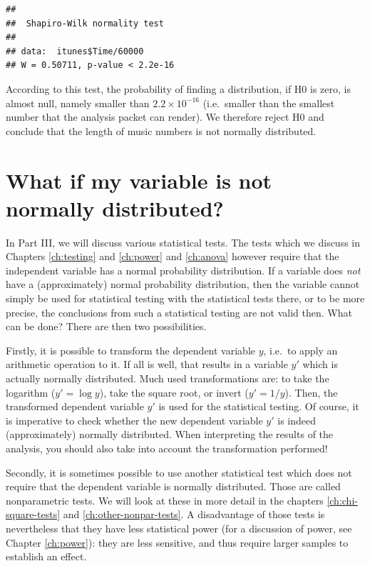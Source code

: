 \documentclass[
]{book}
\begin{document}
\begin{verbatim}
## 
##  Shapiro-Wilk normality test
## 
## data:  itunes$Time/60000
## W = 0.50711, p-value < 2.2e-16
\end{verbatim}

According to this test, the probability of finding a distribution, if H0 is
zero, is almost null, namely smaller than \(2.2 \times 10^{-16}\) (i.e.~smaller than
the smallest number that the analysis packet can render). We therefore
reject H0 and conclude that the length of music numbers is not normally
distributed.

\hypertarget{sec:whatifnotnormal}{%
\section{What if my variable is not normally distributed?}\label{sec:whatifnotnormal}}

In Part III, we will discuss various statistical tests.
The tests which we discuss in Chapters \ref{ch:testing} and \ref{ch:power} and
\ref{ch:anova} however require that the independent
variable has a normal probability distribution. If a variable does \emph{not} have
a (approximately) normal probability distribution, then the variable cannot
simply be used for statistical testing with the statistical tests
there, or to be more precise, the conclusions from such a statistical testing
are not valid then. What can be done? There are then two
possibilities.

Firstly, it is possible to transform the dependent variable \(y\),
i.e.~to apply an arithmetic operation to it. If all is well, that results
in a variable \(y'\) which is actually normally distributed. Much used transformations are: to take the logarithm (\(y'=\log{y}\)), take the square root, or
invert (\(y'=1/y\)). Then, the transformed dependent variable \(y'\) is used for
the statistical testing. Of course, it is imperative to check whether the
new dependent variable \(y'\) is indeed (approximately) normally distributed. When
interpreting the results of the analysis, you should also take into account
the transformation performed!

Secondly, it is sometimes possible to use another statistical test which does
not require that the dependent variable is normally distributed. Those are called
nonparametric tests. We will look at these in more detail in the chapters
\ref{ch:chi-square-tests} and
\ref{ch:other-nonpar-tests}.
A disadvantage of those tests is nevertheless that they have less
statistical power (for a discussion of power,
see Chapter \ref{ch:power}): they are less sensitive, and thus require larger
samples to establish an effect.
\end{document}
